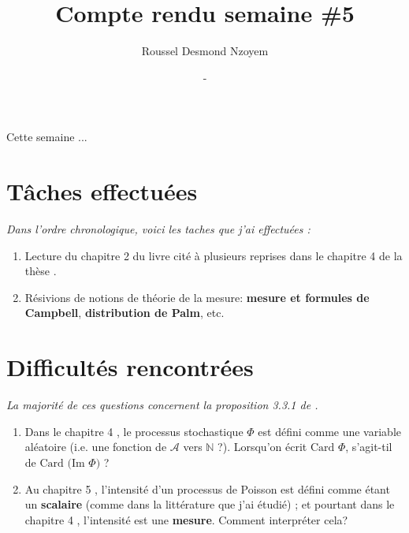 \documentclass[
  french,
	11pt, %
]{fphw}
\title{Compte rendu semaine \#5} %
\author{Roussel Desmond Nzoyem} %
\date{\DTMdisplaydate{2021}{3}{3}{-1} - \DTMdisplaydate{2021}{3}{9}{-1}} %
\institute{Sorbonne Université \\ Laboratoire Jacques-Louis Lions} %
\begin{document}
\maketitle %



Cette semaine ...



\section{Tâches effectuées}

\textit{Dans l'ordre chronologique, voici les taches que j'ai effectuées :}
\begin{enumerate}
  \item Lecture du chapitre 2 du livre \parencite{chiu2013stochastic} cité à plusieurs reprises dans le chapitre 4 de la thèse \parencite{balasoiu2020halthesis}. 
  \item Résivions de notions de théorie de la mesure: \textbf{mesure et formules de Campbell}, \textbf{distribution de Palm}, etc.
\end{enumerate}


\section{Difficultés rencontrées}

\textit{La majorité de ces questions concernent la proposition 3.3.1 de \parencite[p.93]{balasoiu2020halthesis}.}

\begin{enumerate}
  \item Dans le chapitre 4 \parencite[p.113]{balasoiu2020halthesis}, le processus stochastique $\Phi$ est défini comme une variable aléatoire (i.e. une fonction de $\mathcal{A}$ vers $\mathbb{N}$ ?). Lorsqu'on écrit $\text{Card }\Phi$, s'agit-til de  $\text{Card (Im }\Phi)$ ?
  \item Au chapitre 5 \parencite[p.142]{balasoiu2020halthesis}, l'intensité d'un processus de Poisson est défini comme étant un \textbf{scalaire} (comme dans la littérature que j'ai étudié) ; et pourtant dans le chapitre 4 \parencite[p.114]{balasoiu2020halthesis}, l'intensité est une \textbf{mesure}. Comment interpréter cela? 
\end{enumerate}
\end{document}
